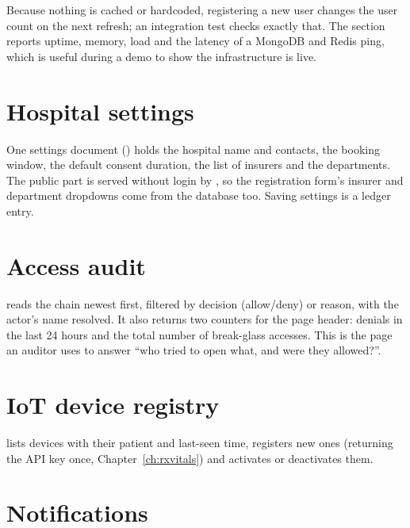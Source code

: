 Because nothing is cached or hardcoded, registering a new user changes the user
count on the next refresh; an integration test checks exactly that. The
 section reports uptime, memory, load and the latency of a MongoDB
and Redis ping, which is useful during a demo to show the infrastructure is live.

\section{Hospital settings}

One settings document () holds the
hospital name and contacts, the booking window, the default consent duration,
the list of insurers and the departments. The public part is served without
login by , so the registration form's insurer and
department dropdowns come from the database too. Saving settings is a ledger
entry.

\section{Access audit}

 reads the  chain newest first, filtered
by decision (allow/deny) or reason, with the actor's name resolved. It also
returns two counters for the page header: denials in the last 24 hours and the
total number of break-glass accesses. This is the page an auditor uses to answer
``who tried to open what, and were they allowed?''.

\section{IoT device registry}

 lists devices with their patient and
last-seen time, registers new ones (returning the API key once, Chapter~\ref{ch:rxvitals})
and activates or deactivates them.

\section{Notifications}

